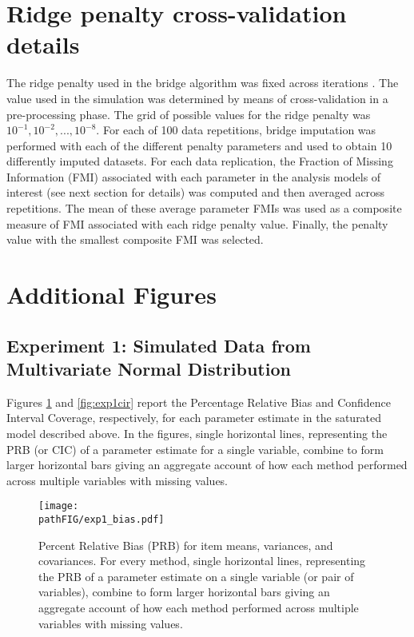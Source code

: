 \documentclass[]{./cls/interact}
\theoremstyle{plain}
\theoremstyle{definition}
\theoremstyle{remark}
\newcommand{\pathFIG}{./figures}
\begin{document}
\section{Ridge penalty cross-validation details}
	The ridge penalty used in the bridge algorithm was fixed across iterations .
	The value used in the simulation was determined by means of cross-validation in a pre-processing phase.
	The grid of possible values for the ridge penalty was $10^{-1}, 10^{-2}, ..., 10^{-8}$.
	For each of 100 data repetitions, bridge imputation was performed with each of the different penalty parameters
	and used to obtain 10 differently imputed datasets.
	For each data replication, the Fraction of Missing Information (FMI) \citep{savaleiRhemtulla:2012} associated with 
	each parameter in the analysis models of interest (see next section for details) was computed and then averaged across 
	repetitions.
	The mean of these average parameter FMIs was used as a composite measure of FMI associated with each ridge penalty
	value.
	Finally, the penalty value with the smallest composite FMI was selected.

\section{Additional Figures}

\subsection{Experiment 1: Simulated Data from Multivariate Normal Distribution}

	Figures \ref{fig:exp1bias} and \ref{fig:exp1cir} report the Percentage Relative Bias and Confidence Interval 
	Coverage, respectively, for each parameter estimate in the saturated model described above. 
	In the figures, single horizontal lines, representing the PRB (or CIC) of a parameter estimate for a single 
	variable, combine to form larger horizontal bars giving an aggregate account of how each method performed 
	across multiple variables with missing values.

\begin{figure}
\centering
\texttt{[image: \\pathFIG/exp1\_bias.pdf]}
\caption{\label{fig:exp1bias}
	Percent Relative Bias (PRB) for item means, variances, and covariances.
	For every method, single horizontal lines, representing the PRB of a parameter estimate on 
	a single variable (or pair of variables), combine to form larger horizontal bars giving an 
	aggregate account of how each method performed across multiple variables with missing values.
	}
\end{figure}
\end{document}
